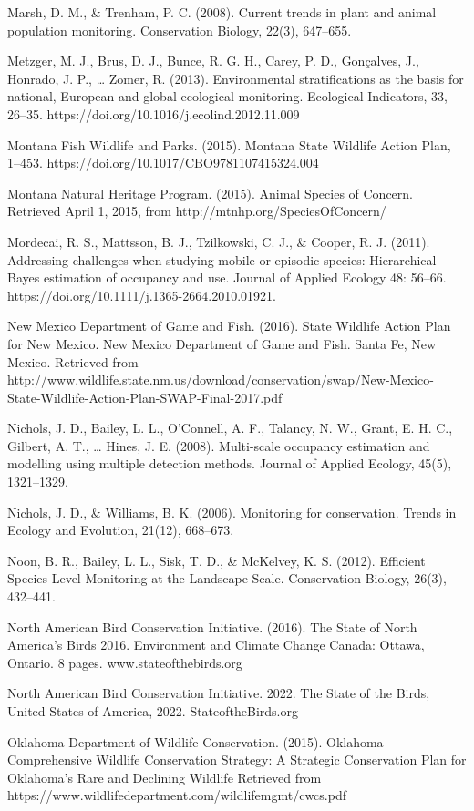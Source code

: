 \documentclass[
  letterpaper,
  DIV=11,
  numbers=noendperiod,
  oneside]{scrreprt}
\begin{document}
Marsh, D. M., \& Trenham, P. C. (2008). Current trends in plant and
animal population monitoring. Conservation Biology, 22(3), 647--655.

Metzger, M. J., Brus, D. J., Bunce, R. G. H., Carey, P. D., Gonçalves,
J., Honrado, J. P., \ldots{} Zomer, R. (2013). Environmental
stratifications as the basis for national, European and global
ecological monitoring. Ecological Indicators, 33, 26--35.
https://doi.org/10.1016/j.ecolind.2012.11.009

Montana Fish Wildlife and Parks. (2015). Montana State Wildlife Action
Plan, 1--453. https://doi.org/10.1017/CBO9781107415324.004

Montana Natural Heritage Program. (2015). Animal Species of Concern.
Retrieved April 1, 2015, from http://mtnhp.org/SpeciesOfConcern/

Mordecai, R. S., Mattsson, B. J., Tzilkowski, C. J., \& Cooper, R. J.
(2011). Addressing challenges when studying mobile or episodic species:
Hierarchical Bayes estimation of occupancy and use. Journal of Applied
Ecology 48: 56--66. https://doi.org/10.1111/j.1365-2664.2010.01921.

New Mexico Department of Game and Fish. (2016). State Wildlife Action
Plan for New Mexico. New Mexico Department of Game and Fish. Santa Fe,
New Mexico. Retrieved from
http://www.wildlife.state.nm.us/download/conservation/swap/New-Mexico-State-Wildlife-Action-Plan-SWAP-Final-2017.pdf

Nichols, J. D., Bailey, L. L., O'Connell, A. F., Talancy, N. W., Grant,
E. H. C., Gilbert, A. T., \ldots{} Hines, J. E. (2008). Multi-scale
occupancy estimation and modelling using multiple detection methods.
Journal of Applied Ecology, 45(5), 1321--1329.

Nichols, J. D., \& Williams, B. K. (2006). Monitoring for conservation.
Trends in Ecology and Evolution, 21(12), 668--673.

Noon, B. R., Bailey, L. L., Sisk, T. D., \& McKelvey, K. S. (2012).
Efficient Species-Level Monitoring at the Landscape Scale. Conservation
Biology, 26(3), 432--441.

North American Bird Conservation Initiative. (2016). The State of North
America's Birds 2016. Environment and Climate Change Canada: Ottawa,
Ontario. 8 pages. www.stateofthebirds.org

North American Bird Conservation Initiative. 2022. The State of the
Birds, United States of America, 2022. StateoftheBirds.org

Oklahoma Department of Wildlife Conservation. (2015). Oklahoma
Comprehensive Wildlife Conservation Strategy: A Strategic Conservation
Plan for Oklahoma's Rare and Declining Wildlife Retrieved from
https://www.wildlifedepartment.com/wildlifemgmt/cwcs.pdf
\end{document}
